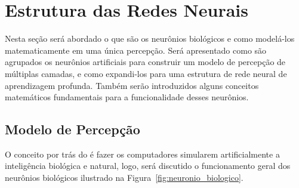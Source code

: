 
            
 





    \section{Estrutura das Redes Neurais}\label{cap:NN}
        
        Nesta seção será abordado o que são os neurônios biológicos e como modelá-los matematicamente em uma única percepção. Será apresentado como são agrupados os neurônios artificiais para construir um modelo de percepção de múltiplas camadas, e como expandi-los para uma estrutura de rede neural de aprendizagem profunda. Também serão introduzidos alguns conceitos matemáticos fundamentais para a funcionalidade desses neurônios.
        
        \subsection{Modelo de Percepção}\label{cap:modelo_percepção}
        
            O conceito por trás do \ap é fazer os computadores simularem artificialmente a inteligência biológica e natural, logo, será discutido o funcionamento geral dos neurônios biológicos ilustrado na Figura~\ref{fig:neuronio_biologico}.
                
